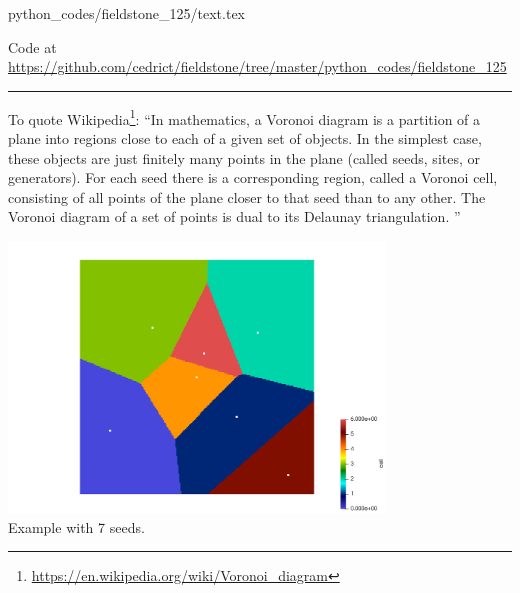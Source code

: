 \begin{flushright} {\tiny {\color{gray} python\_codes/fieldstone\_125/text.tex}} \end{flushright}

%

\begin{center}

Code at \url{https://github.com/cedrict/fieldstone/tree/master/python_codes/fieldstone_125}
\end{center}

\par\noindent\rule{\textwidth}{0.4pt}



To quote Wikipedia\footnote{\url{https://en.wikipedia.org/wiki/Voronoi_diagram}}:
``In mathematics, a Voronoi diagram is a partition of a plane into regions close to each of a given set of objects. 
In the simplest case, these objects are just finitely many points in the plane (called seeds, sites, or generators). 
For each seed there is a corresponding region, called a Voronoi cell, consisting of all points of the plane closer to 
that seed than to any other. The Voronoi diagram of a set of points is dual to its Delaunay triangulation. ''


\begin{center}
\includegraphics[width=10cm]{python_codes/fieldstone_125/results/diagram.png}\\
{\captionfont Example with 7 seeds.}
\end{center}




